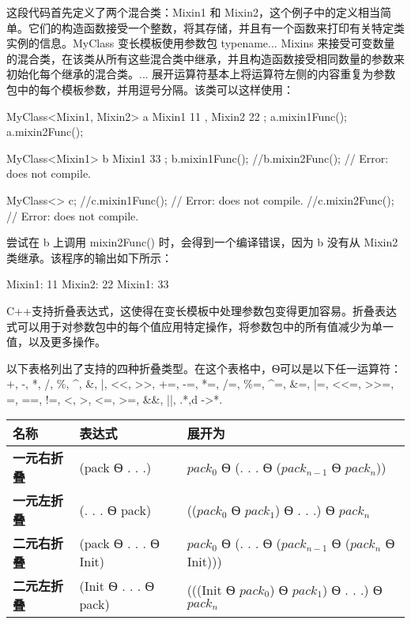 这段代码首先定义了两个混合类：Mixin1 和 Mixin2，这个例子中的定义相当简单。它们的构造函数接受一个整数，将其存储，并且有一个函数来打印有关特定类实例的信息。MyClass 变长模板使用参数包 typename... Mixins 来接受可变数量的混合类，在该类从所有这些混合类中继承，并且构造函数接受相同数量的参数来初始化每个继承的混合类。... 展开运算符基本上将运算符左侧的内容重复为参数包中的每个模板参数，并用逗号分隔。该类可以这样使用：

\begin{cpp}
MyClass<Mixin1, Mixin2> a { Mixin1 { 11 }, Mixin2 { 22 } };
a.mixin1Func();
a.mixin2Func();

MyClass<Mixin1> b { Mixin1 { 33 } };
b.mixin1Func();
//b.mixin2Func(); // Error: does not compile.

MyClass<> c;
//c.mixin1Func(); // Error: does not compile.
//c.mixin2Func(); // Error: does not compile.
\end{cpp}

尝试在 b 上调用 mixin2Func() 时，会得到一个编译错误，因为 b 没有从 Mixin2 类继承。该程序的输出如下所示：

\begin{shell}
Mixin1: 11
Mixin2: 22
Mixin1: 33
\end{shell}


C++支持折叠表达式，这使得在变长模板中处理参数包变得更加容易。折叠表达式可以用于对参数包中的每个值应用特定操作，将参数包中的所有值减少为单一值，以及更多操作。

以下表格列出了支持的四种折叠类型。在这个表格中，Ѳ可以是以下任一运算符：+, -, *, /, \%, \^{}, \&, |, <{}<, >{}>, +=, -=, *=, /=, \%=, \^{}=, \&=, |=, <{}<=, >{}>=, =, ==, !=, <, >, <=, >=, \&\&, ||, .*,d ->*.

\begin{longtable}{|l|l|l|}
\hline
\textbf{名称}             & \textbf{表达式} & \textbf{展开为}             \\ \hline
\endfirsthead
%
\endhead
%
\textbf{一元右折叠} & (pack Ѳ . . .)      & $pack_0$ Ѳ (. . . Ѳ ($pack_{n-1}$ Ѳ $pack_n$)) \\ \hline
\textbf{一元左折叠}  & (. . . Ѳ pack)      & (($pack_0$ Ѳ $pack_1$) Ѳ . . .) Ѳ $pack_n$   \\ \hline
\textbf{二元右折叠} & (pack Ѳ . . . Ѳ Init) & $pack_0$ Ѳ (. . . Ѳ ($pack_{n-1}$ Ѳ ($pack_n$ Ѳ Init))) \\ \hline
\textbf{二元左折叠}  & (Init Ѳ . . . Ѳ pack) & (((Init Ѳ $pack_0$) Ѳ $pack_1$) Ѳ . . .) Ѳ $pack_n$   \\ \hline
\end{longtable}

